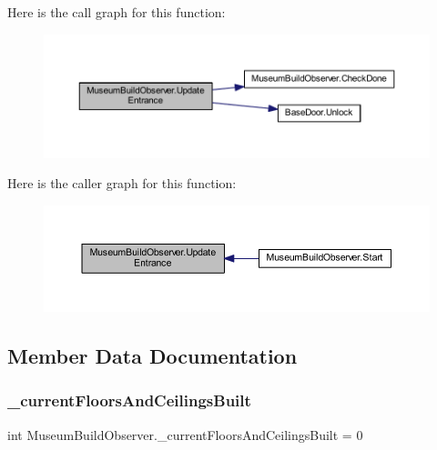 Here is the call graph for this function\+:
\nopagebreak
\begin{figure}[H]
\begin{center}
\leavevmode
\includegraphics[width=350pt]{class_museum_build_observer_aa808cdf3870a709891e1dc4262c5aec1_cgraph}
\end{center}
\end{figure}
Here is the caller graph for this function\+:
\nopagebreak
\begin{figure}[H]
\begin{center}
\leavevmode
\includegraphics[width=350pt]{class_museum_build_observer_aa808cdf3870a709891e1dc4262c5aec1_icgraph}
\end{center}
\end{figure}


\subsection{Member Data Documentation}
\mbox{\label{class_museum_build_observer_ac17e9eb255546c561bcae3744c824aa0}} 
\subsubsection{\texorpdfstring{\+\_\+current\+Floors\+And\+Ceilings\+Built}{\_currentFloorsAndCeilingsBuilt}}
{\footnotesize\ttfamily int Museum\+Build\+Observer.\+\_\+current\+Floors\+And\+Ceilings\+Built = 0\hspace{0.3cm}{\ttfamily [private]}}

